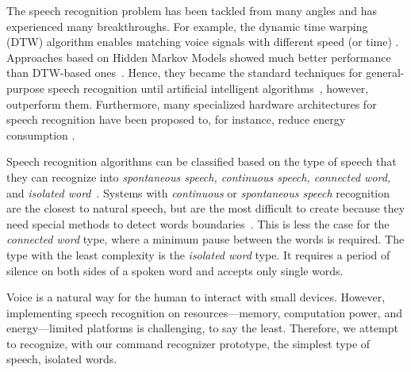 The speech recognition problem has been tackled from many angles and has experienced many breakthroughs. For example, the dynamic time warping (DTW) algorithm enables matching voice signals with different speed (or time) \cite{vintsyuk1972}. 
Approaches based on Hidden Markov Models showed much better performance than DTW-based ones~\cite{jelinek1997statistical}. Hence, they became the standard techniques for general-purpose speech recognition until artificial intelligent algorithms~\cite{hinton2012deep}, however, outperform them. Furthermore, many specialized hardware architectures for speech recognition have been proposed to, for instance, reduce energy consumption \cite{price2018low,price20156}. 

Speech recognition algorithms can be classified based on the type of speech that they can recognize into \textit{spontaneous speech, continuous speech, connected word,} and \textit{isolated word}~\cite{gaikwad2010review}.
Systems with \textit{continuous} or \textit{spontaneous speech} recognition are the closest to natural speech, but are the most difficult to create because they need special methods to detect words boundaries~\cite{gaikwad2010review}. This is less the case for the \textit{connected word} type, where a minimum pause between the words is required.
 The type with the least complexity is the \textit{isolated word} type. It requires a period of silence on both sides of a spoken word and accepts only single words. 
 
Voice is a natural way for the human to interact with small devices. However,
implementing speech recognition on resources---memory, computation power, and energy---limited platforms is challenging, to say the least. Therefore, we attempt to recognize, with our command recognizer prototype, the simplest type of speech, isolated words. 
